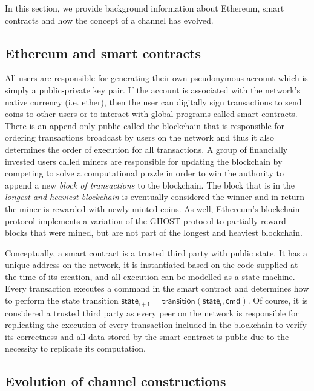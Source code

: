 \documentclass{llncs}
\newcommand{\stateinfoi}{\mathsf{state}_{\mathsf{i}}}
\newcommand{\stateinfoplus}{\mathsf{state}_{\mathsf{i+1}}}
\begin{document}
In this section, we provide background information about Ethereum, smart contracts and how the concept of a channel has evolved. 

\subsection{Ethereum and smart contracts}

All users are responsible for generating their own pseudonymous account which is simply a public-private key pair. 
If the account is associated with the network's native currency (i.e. ether), then the user can digitally sign transactions to send coins to other users or to interact with global programs called smart contracts. 
There is an append-only public called the blockchain that is responsible for ordering transactions broadcast by users on the network and thus it also determines the order of execution for all transactions.
A group of financially invested users called miners are responsible for updating the blockchain by competing to solve a computational puzzle in order to win the authority to append a new \textit{block of transactions} to the blockchain.
The block that is in the \textit{longest and heaviest blockchain} is eventually considered the winner and in return the miner is rewarded with newly minted coins. 
As well, Ethereum's blockchain protocol implements a variation of the GHOST protocol to partially reward blocks that were mined, but are not part of the longest and heaviest blockchain. 

Conceptually, a smart contract is a trusted third party with public state. 
It has a unique address on the network, it is instantiated based on the code supplied at the time of its creation, and all execution can be modelled as a state machine. 
Every transaction executes a command in the smart contract and determines how to perform the state transition $\stateinfoplus = \mathsf{transition}(\stateinfoi, \mathsf{cmd})$. 
Of course, it is considered a trusted third party as every peer on the network is responsible for replicating the execution of every transaction included in the blockchain to verify its correctness and all data stored by the smart contract is public due to the necessity to replicate its computation. 

\subsection{Evolution of channel constructions}
\end{document}
